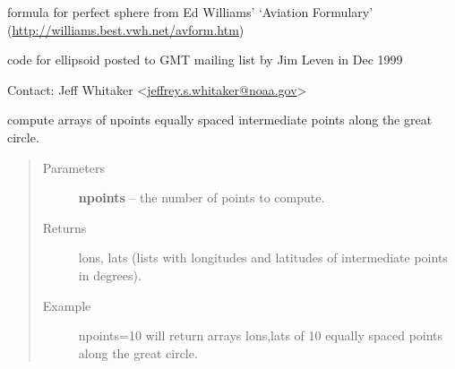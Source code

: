 \documentclass[letterpaper,10pt,english]{sphinxmanual}
\begin{document}
\begin{fulllineitems}
\label{docs/utilities:vincenty.GreatCircle}
formula for perfect sphere from Ed Williams' `Aviation Formulary'
(\href{http://williams.best.vwh.net/avform.htm}{http://williams.best.vwh.net/avform.htm})

code for ellipsoid posted to GMT mailing list by Jim Leven in Dec 1999

Contact: Jeff Whitaker \textless{}\href{mailto:jeffrey.s.whitaker@noaa.gov}{jeffrey.s.whitaker@noaa.gov}\textgreater{}


\begin{fulllineitems}
\label{docs/utilities:vincenty.GreatCircle.points}
compute arrays of npoints equally spaced
intermediate points along the great circle.
\begin{quote}\begin{description}
\item[{Parameters}] \leavevmode
\textbf{npoints} -- the number of points to compute.

\item[{Returns }] \leavevmode
lons, lats (lists with longitudes and latitudes
of intermediate points in degrees).

\item[{Example }] \leavevmode
npoints=10 will return arrays lons,lats of 10
equally spaced points along the great circle.

\end{description}\end{quote}

\end{fulllineitems}


\end{fulllineitems}


\end{document}
